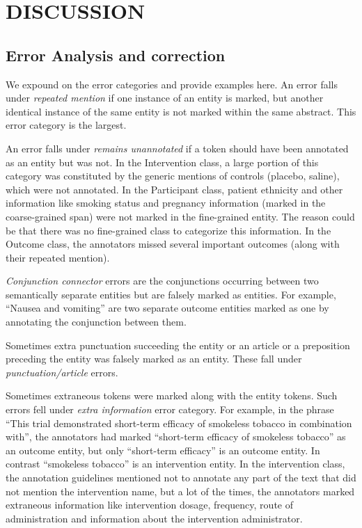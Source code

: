 \documentclass[10.7pt,]{article}
\begin{document}
%
%
%
\section{DISCUSSION}\label{discussion}
%
\subsection{Error Analysis and correction}\label{err_ana}
%
We expound on the error categories and provide examples here.
An error falls under \textit{repeated mention} if one instance of an entity is marked, but another identical instance of the same entity is not marked within the same abstract. 
This error category is the largest.

An error falls under \textit{remains unannotated} if a token should have been annotated as an entity but was not.
In the Intervention class, a large portion of this category was constituted by the generic mentions of controls (placebo, saline), which were not annotated.
In the Participant class, patient ethnicity and other information like smoking status and pregnancy information (marked in the coarse-grained span) were not marked in the fine-grained entity.
The reason could be that there was no fine-grained class to categorize this information. 
In the Outcome class, the annotators missed several important outcomes (along with their repeated mention).

\textit{Conjunction connector} errors are the conjunctions occurring between two semantically separate entities but are falsely marked as entities.
For example, ``Nausea and vomiting'' are two separate outcome entities marked as one by annotating the conjunction between them.

Sometimes extra punctuation succeeding the entity or an article or a preposition preceding the entity was falsely marked as an entity. These fall under \textit{punctuation/article} errors.

Sometimes extraneous tokens were marked along with the entity tokens. 
Such errors fell under \textit{extra information} error category.
For example, in the phrase ``This trial demonstrated short-term efficacy of smokeless tobacco in combination with'', the annotators had marked ``short-term efficacy of smokeless tobacco'' as an outcome entity, but only ``short-term efficacy'' is an outcome entity. In contrast ``smokeless tobacco'' is an intervention entity. 
In the intervention class, the annotation guidelines mentioned not to annotate any part of the text that did not mention the intervention name, but a lot of the times, the annotators marked extraneous information like intervention dosage, frequency, route of administration and information about the intervention administrator.
\end{document}
